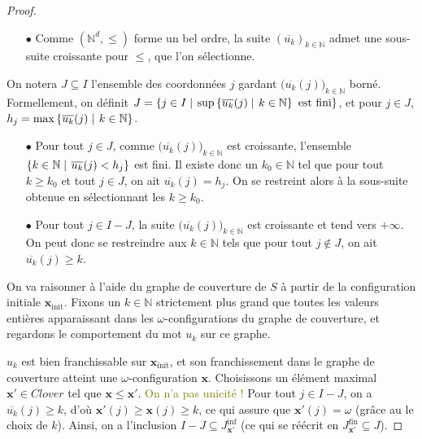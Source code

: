 \documentclass[a4paper,final]{article}
\theoremstyle{definition}
\let\leq\leqslant
\let\geq\geqslant
\newcommand{\alain}[1]{\textcolor{blue}{#1}}
\newcommand{\lucas}[1]{\textcolor{olive}{#1}}
\newcommand{\set}[2]{\left\{#1\mathrel{\left|\vphantom{#1}\vphantom{#2}\right.}#2\right\}}
\newcommand{\N}{\ensuremath{\mathbb{N}}}
\newcommand{\clover}{\textit{Clover}}
\newcommand{\vect}[1]{\ensuremath{\mathbf{#1}}}
\newcommand{\xinit}{\ensuremath{\vect{x}_\text{init}}}
\newcommand{\valeur}[1]{\ensuremath{\overline{#1}}}
\newcommand{\Jfin}[1]{J^\text{fin}_{#1}}
\newcommand{\Jinf}[1]{J^\text{inf}_{#1}}
\begin{document}
\begin{proof}
\begin{itemize}
    \item[$\bullet$] Comme $(\N^d,\leq)$ forme un bel ordre, la suite $(\valeur{u_k})_{k\in\N}$ admet une sous-suite croissante pour $\leq$, que l'on sélectionne.
\end{itemize}
On notera $J\subseteq I$ l'ensemble des coordonnées $j$ gardant $\big( \valeur{u_k}(j) \big)_{k\in\N}$ borné.
Formellement, on définit $J = \set{j\in I} {\text{sup} \set{\valeur{u_k}(j)} {k\in\N} \text{ est fini}}$,
et pour $j\in J$, $h_j = \max \set{\valeur{u_k}(j)}{k\in\N}$.

 \begin{itemize}   
    \item[$\bullet$] Pour tout $j\in J$, comme $\big( \valeur{u_k}(j) \big)_{k\in\N}$ est croissante, l'ensemble $\set{k\in\N} {\valeur{u_k}(j) < h_j}$ est fini.
    Il existe donc un $k_0\in\N$ tel que pour tout $k\geq k_0$ et tout $j\in J$, on ait $\valeur{u_k}(j) = h_j$.
    On se restreint alors à la sous-suite obtenue en sélectionnant les $k\geq k_0$.
    
    \item[$\bullet$] Pour tout $j\in I-J$, la suite $\big( \valeur{u_k}(j) \big)_{k\in\N}$ est croissante et tend vers $+\infty$.
    On peut donc se restreindre aux $k\in\N$ tels que pour tout $j\notin J$, on ait $\valeur{u_k}(j) \geq k$.
\end{itemize}

\vspace{2mm}
On va raisonner à l'aide du graphe de couverture de $S$ à partir de la configuration initiale $\xinit$.
Fixons un $k\in\N$ strictement plus grand que toutes les valeurs entières apparaissant dans les $\omega$-configurations du graphe de couverture, et regardons le comportement du mot $u_k$ sur ce graphe.

$u_k$ est bien franchissable sur $\xinit$, et son franchissement dans le graphe de couverture atteint une $\omega$-configuration $\vect{x}$.
Choisissons un élément maximal $\vect{x'}\in\clover$ tel que $\vect{x} \leq \vect{x'}$.
\lucas{On n'a pas unicité !}
Pour tout $j\in I-J$, on a $\valeur{u_k}(j) \geq k$, d'où $\vect{x'}(j) \geq \vect{x}(j) \geq k$, ce qui assure que $\vect{x'}(j) = \omega$ (grâce au le choix de $k$).
Ainsi, on a l'inclusion $I-J \subseteq \Jinf{\vect{x'}}$ (ce qui se réécrit en $\Jfin{\vect{x'}} \subseteq J$).


\end{proof}
\end{document}
